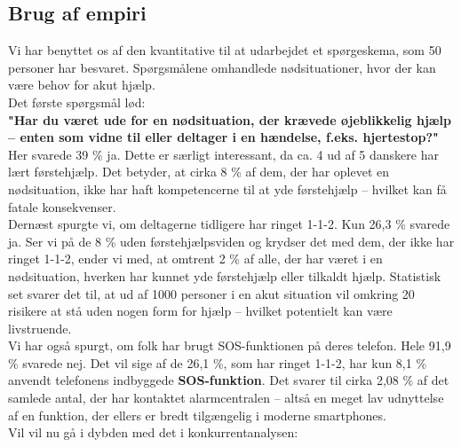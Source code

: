 \subsection{Brug af empiri}
Vi har benyttet os af den kvantitative til at udarbejdet et spørgeskema, som 50 personer har besvaret. Spørgsmålene omhandlede nødsituationer, hvor der kan være behov for akut hjælp.\\
Det første spørgsmål lød:\\
\textbf{"Har du været ude for en nødsituation, der krævede øjeblikkelig hjælp – enten som vidne til eller deltager i en hændelse, f.eks. hjertestop?"}\\
Her svarede 39 \% ja. Dette er særligt interessant, da ca. 4 ud af 5 danskere har lært førstehjælp. Det betyder, at cirka 8 \% af dem, der har oplevet en nødsituation, ikke har haft kompetencerne til at yde førstehjælp – hvilket kan få fatale konsekvenser. \\
Dernæst spurgte vi, om deltagerne tidligere har ringet 1-1-2. Kun 26,3 \% svarede ja. Ser vi på de 8 \% uden førstehjælpsviden og krydser det med dem, der ikke har ringet 1-1-2, ender vi med, at omtrent 2 \% af alle, der har været i en nødsituation, hverken har kunnet yde førstehjælp eller tilkaldt hjælp. Statistisk set svarer det til, at ud af 1000 personer i en akut situation vil omkring 20 risikere at stå uden nogen form for hjælp – hvilket potentielt kan være livstruende.\\
Vi har også spurgt, om folk har brugt SOS-funktionen på deres telefon. Hele 91,9 \% svarede nej. 
Det vil sige af de 26,1 \%, som har ringet 1-1-2, har kun 8,1 \% anvendt telefonens indbyggede \textbf{SOS-funktion}. Det svarer til cirka 2,08 \% af det samlede antal, der har kontaktet alarmcentralen – altså en meget lav udnyttelse af en funktion, der ellers er bredt tilgængelig i moderne smartphones.\\
Vil vil nu gå i dybden med det i konkurrentanalysen:

\newpage
